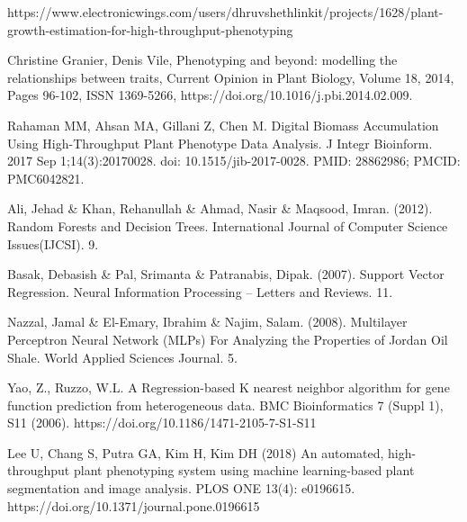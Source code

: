 \documentclass[a4paper,11pt]{report}%
\renewcommand{\\}{\vspace*{0.5\baselineskip} \newline}
\begin{document}
\newpage
\begin{thebibliography}{1}


https://www.electronicwings.com/users/dhruvshethlinkit/projects/1628/plant-growth-estimation-for-high-throughput-phenotyping

Christine Granier, Denis Vile,
Phenotyping and beyond: modelling the relationships between traits,
Current Opinion in Plant Biology,
Volume 18,
2014,
Pages 96-102,
ISSN 1369-5266,
https://doi.org/10.1016/j.pbi.2014.02.009.

Rahaman MM, Ahsan MA, Gillani Z, Chen M. Digital Biomass Accumulation Using High-Throughput Plant Phenotype Data Analysis. J Integr Bioinform. 2017 Sep 1;14(3):20170028. doi: 10.1515/jib-2017-0028. PMID: 28862986; PMCID: PMC6042821.

Ali, Jehad \& Khan, Rehanullah \& Ahmad, Nasir \& Maqsood, Imran. (2012). Random Forests and Decision Trees. International Journal of Computer Science Issues(IJCSI). 9. 

Basak, Debasish \& Pal, Srimanta \& Patranabis, Dipak. (2007). Support Vector Regression. Neural Information Processing – Letters and Reviews. 11. 

Nazzal, Jamal \& El-Emary, Ibrahim \& Najim, Salam. (2008). Multilayer Perceptron Neural Network (MLPs) For Analyzing the Properties of Jordan Oil Shale. World Applied Sciences Journal. 5. 

Yao, Z., Ruzzo, W.L. A Regression-based K nearest neighbor algorithm for gene function prediction from heterogeneous data. BMC Bioinformatics 7 (Suppl 1), S11 (2006). https://doi.org/10.1186/1471-2105-7-S1-S11

Lee U, Chang S, Putra GA, Kim H, Kim DH (2018) An automated, high-throughput plant phenotyping system using machine learning-based plant segmentation and image analysis. PLOS ONE 13(4): e0196615. https://doi.org/10.1371/journal.pone.0196615


\end{thebibliography}
\newpage
\appendix
\end{document}
